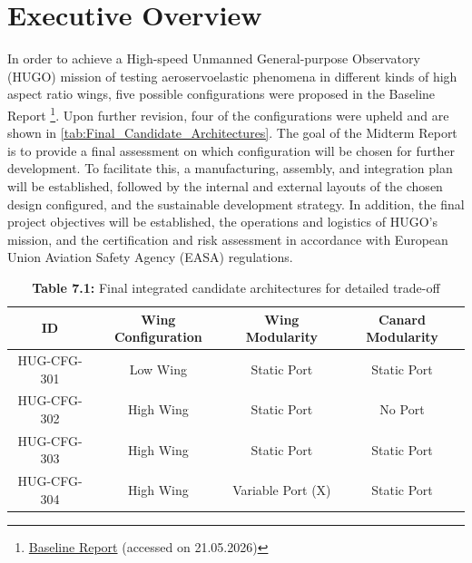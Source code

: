 \chapter{Executive Overview}\label{sec:executive_overview}


In order to achieve a High-speed Unmanned General-purpose Observatory (HUGO) mission of testing aeroservoelastic phenomena in different kinds of high aspect ratio wings, five possible configurations were proposed in the Baseline Report \footnote{\label{url:baseline_report}\href{https://github.com/Teo-Cokonaj/DSE-28/blob/main/docs/Projects/DSE_Group_28_Baseline_Report.pdf}{Baseline Report} (accessed on 21.05.2026)}. Upon further revision, four of the configurations were upheld and are shown in \autoref{tab:Final_Candidate_Architectures}. The goal of the Midterm Report is to provide a final assessment on which configuration will be chosen for further development. To facilitate this, a manufacturing, assembly, and integration plan will be established, followed by the internal and external layouts of the chosen design configured, and the sustainable development strategy. In addition, the final project objectives will be established, the operations and logistics of HUGO's mission, and the certification and risk assessment in accordance with European Union Aviation Safety Agency (EASA) regulations.



\begin{table}[H]
    \centering
    \caption*{\textbf{Table 7.1:} Final integrated candidate architectures for detailed trade-off   }
    \label{tab:Final_Candidate_Architectures}
    
    \begin{tabular}{|c|c|c|c|}
        \hline
        \textbf{ID} & \textbf{Wing Configuration} & \textbf{Wing Modularity} & \textbf{Canard Modularity} \\
        \hline\hline
        HUG-CFG-301 & Low Wing & Static Port & Static Port \\
        \hline
        HUG-CFG-302 & High Wing & Static Port & No Port \\
        \hline
        HUG-CFG-303 & High Wing & Static Port & Static Port \\
        \hline
        HUG-CFG-304 & High Wing & Variable Port (X) & Static Port \\
        \hline
    \end{tabular}
\end{table}

